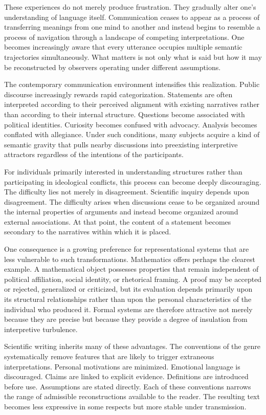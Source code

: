 \documentclass[11pt]{article}
\theoremstyle{plain}
\begin{document}
These experiences do not merely produce frustration. They gradually alter one's understanding of language itself. Communication ceases to appear as a process of transferring meanings from one mind to another and instead begins to resemble a process of navigation through a landscape of competing interpretations. One becomes increasingly aware that every utterance occupies multiple semantic trajectories simultaneously. What matters is not only what is said but how it may be reconstructed by observers operating under different assumptions.

The contemporary communication environment intensifies this realization. Public discourse increasingly rewards rapid categorization. Statements are often interpreted according to their perceived alignment with existing narratives rather than according to their internal structure. Questions become associated with political identities. Curiosity becomes confused with advocacy. Analysis becomes conflated with allegiance. Under such conditions, many subjects acquire a kind of semantic gravity that pulls nearby discussions into preexisting interpretive attractors regardless of the intentions of the participants.

For individuals primarily interested in understanding structures rather than participating in ideological conflicts, this process can become deeply discouraging. The difficulty lies not merely in disagreement. Scientific inquiry depends upon disagreement. The difficulty arises when discussions cease to be organized around the internal properties of arguments and instead become organized around external associations. At that point, the content of a statement becomes secondary to the narratives within which it is placed.

One consequence is a growing preference for representational systems that are less vulnerable to such transformations. Mathematics offers perhaps the clearest example. A mathematical object possesses properties that remain independent of political affiliation, social identity, or rhetorical framing. A proof may be accepted or rejected, generalized or criticized, but its evaluation depends primarily upon its structural relationships rather than upon the personal characteristics of the individual who produced it. Formal systems are therefore attractive not merely because they are precise but because they provide a degree of insulation from interpretive turbulence.

Scientific writing inherits many of these advantages. The conventions of the genre systematically remove features that are likely to trigger extraneous interpretations. Personal motivations are minimized. Emotional language is discouraged. Claims are linked to explicit evidence. Definitions are introduced before use. Assumptions are stated directly. Each of these conventions narrows the range of admissible reconstructions available to the reader. The resulting text becomes less expressive in some respects but more stable under transmission.
\end{document}
